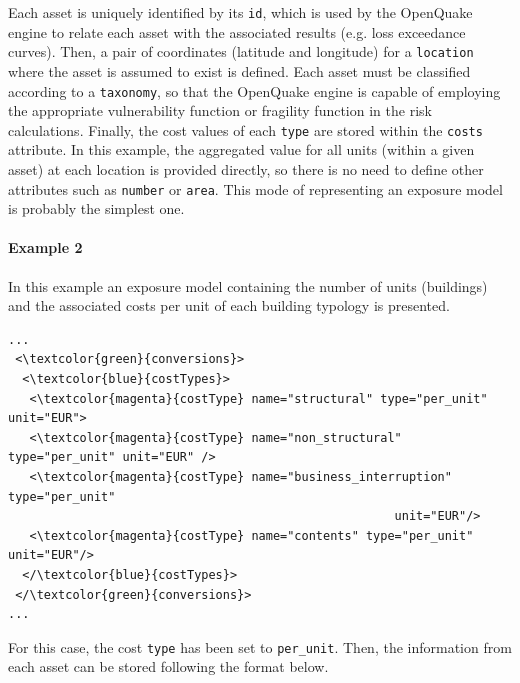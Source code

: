 Each \gls{asset} is uniquely identified by its \Verb+id+, which is used by the OpenQuake engine to relate each asset with the associated results (e.g. loss exceedance curves). Then, a pair of coordinates (latitude and longitude) for a \Verb+location+ where the asset is assumed to exist is defined. Each asset must be classified according to a \Verb+taxonomy+, so that the OpenQuake engine is capable of employing the appropriate \gls{vulnerability function} or \gls{fragility function} in the risk calculations. Finally, the cost values of each \Verb+type+ are stored within the \Verb+costs+ attribute. In this example, the aggregated value for all units (within a given asset) at each location is provided directly, so there is no need to define other attributes such as \Verb+number+ or \Verb+area+. This mode of representing an exposure model is probably the simplest one.

\paragraph{Example 2}
In this example an \gls{exposure model} containing the number of units (buildings) and the associated costs per unit of each building typology is presented.

\begin{Verbatim}[frame=single, commandchars=\\\{\}, samepage=false]
...
 <\textcolor{green}{conversions}>
  <\textcolor{blue}{costTypes}>
   <\textcolor{magenta}{costType} name="structural" type="per_unit" unit="EUR">
   <\textcolor{magenta}{costType} name="non_structural" type="per_unit" unit="EUR" />
   <\textcolor{magenta}{costType} name="business_interruption" type="per_unit" 
                                                      unit="EUR"/>
   <\textcolor{magenta}{costType} name="contents" type="per_unit" unit="EUR"/>
  </\textcolor{blue}{costTypes}>
 </\textcolor{green}{conversions}>
...
\end{Verbatim}

For this case, the cost \Verb+type+ has been set to \Verb+per_unit+. Then, the information from each asset can be stored following the format below.  

